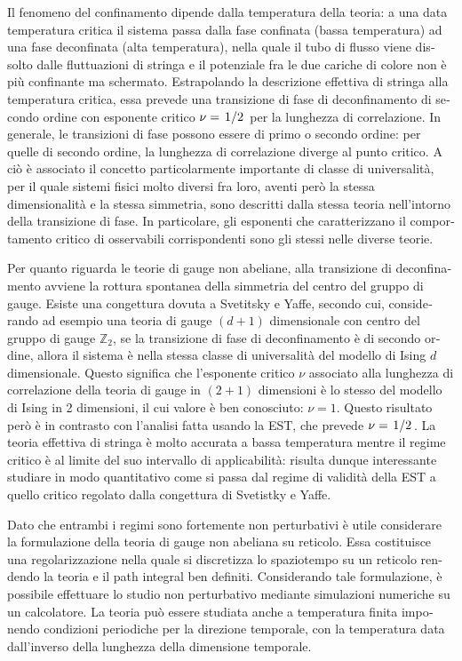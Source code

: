 \documentclass[reqno,11pt]{article}
\numberwithin{equation}{section}
\begin{document}
\begin{otherlanguage}{italian}
Il fenomeno del confinamento dipende dalla temperatura della teoria: a una data temperatura critica il sistema passa dalla fase 
confinata (bassa temperatura) ad una fase deconfinata (alta temperatura), nella quale il tubo di flusso viene dissolto dalle 
fluttuazioni di stringa e il potenziale fra le due cariche di colore non è più confinante ma schermato. Estrapolando la 
descrizione effettiva di stringa alla temperatura critica, essa prevede una transizione di fase di deconfinamento di secondo 
ordine con esponente critico $\nu = \flatfrac{1}{2}$ per la lunghezza di correlazione. 
In generale, le transizioni di fase possono essere di primo o secondo ordine: per quelle di secondo ordine, la lunghezza di correlazione 
diverge al punto critico. A ciò è associato il concetto particolarmente importante di classe di universalità, per il quale 
sistemi fisici molto diversi fra loro, aventi però la stessa dimensionalità e la stessa simmetria, sono descritti dalla stessa 
teoria nell’intorno della transizione di fase. In particolare, gli esponenti che caratterizzano il comportamento critico di 
osservabili corrispondenti sono gli stessi nelle diverse teorie.

Per quanto riguarda le teorie di gauge non abeliane, alla transizione di deconfinamento avviene la rottura spontanea della 
simmetria del centro del gruppo di gauge. Esiste una congettura dovuta a Svetitsky e Yaffe, secondo cui, considerando ad esempio 
una teoria di gauge $(d+1)$ dimensionale con centro del gruppo di gauge $\mathbb{Z}_2$, se la transizione di fase di deconfinamento
è di secondo ordine, allora il sistema è nella stessa classe di universalità del modello di Ising $d$ dimensionale. Questo 
significa che l’esponente critico $\nu$ associato alla lunghezza di correlazione della teoria di gauge in $(2+1)$ dimensioni è lo 
stesso del modello di Ising in 2 dimensioni, il cui valore è ben conosciuto: $\nu = 1$. Questo risultato però è in contrasto 
con l’analisi fatta usando la EST, che prevede $\nu = \flatfrac{1}{2}$. La teoria effettiva di stringa è molto accurata a 
bassa temperatura mentre il regime critico è al limite del suo intervallo di applicabilità: risulta dunque interessante 
studiare in modo quantitativo come si passa dal regime di validità della EST a quello critico regolato dalla congettura 
di Svetistky e Yaffe.

Dato che entrambi i regimi sono fortemente non perturbativi è utile considerare la formulazione della teoria di gauge non 
abeliana su reticolo. Essa costituisce una regolarizzazione nella quale si discretizza lo spaziotempo su un reticolo rendendo
la teoria e il path integral ben definiti. Considerando tale formulazione, è possibile effettuare lo studio 
non perturbativo mediante simulazioni numeriche su un calcolatore. La teoria può essere studiata anche a temperatura finita 
imponendo condizioni periodiche per la direzione temporale, con la temperatura data dall’inverso della lunghezza della 
dimensione temporale.


\end{otherlanguage}
\end{document}
